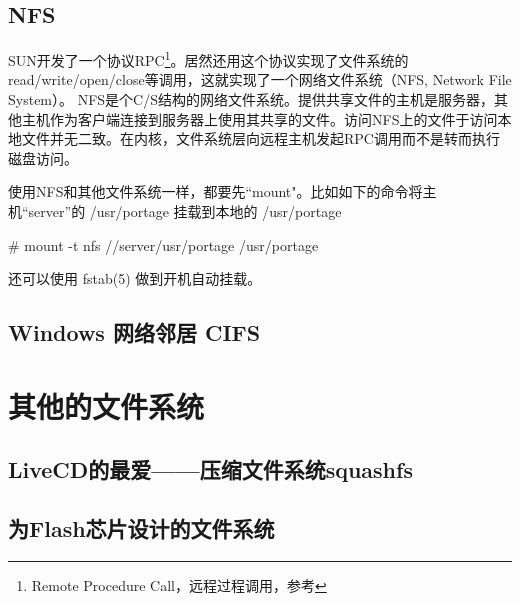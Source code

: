 \subsection{NFS}

SUN开发了一个协议RPC\footnote{Remote Procedure Call，远程过程调用，参考 }。居然还用这个协议实现了文件系统的read/write/open/close等调用，这就实现了一个网络文件系统（NFS, Network File System）。
NFS是个C/S结构的网络文件系统。提供共享文件的主机是服务器，其他主机作为客户端连接到服务器上使用其共享的文件。访问NFS上的文件于访问本地文件并无二致。在内核，文件系统层向远程主机发起RPC调用而不是转而执行磁盘访问。

使用NFS和其他文件系统一样，都要先``mount"。比如如下的命令将主机``server''的 /usr/portage 挂载到本地的	/usr/portage

\begin{code}
\# mount -t nfs //server/usr/portage	/usr/portage
\end{code}

还可以使用 fstab(5) 做到开机自动挂载。

\subsection{Windows 网络邻居 CIFS}

\section{其他的文件系统}

\subsection{LiveCD的最爱——压缩文件系统squashfs}

\subsection{为Flash芯片设计的文件系统}
